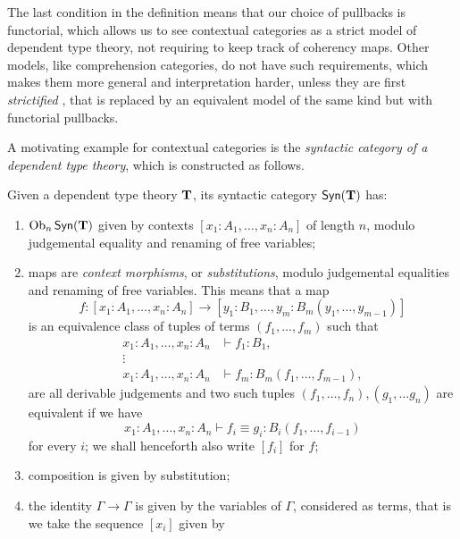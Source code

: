 \begin{rmk}
  The last condition in the definition means that our choice of pullbacks is
  functorial, which allows us to see contextual categories as a strict model of
  dependent type theory, not requiring to keep track of coherency maps.
  Other models, like comprehension categories, do not
  have such requirements, which makes them more general and
  interpretation harder, unless they are first \emph{strictified} \cite{Lum15},
  that is replaced by an equivalent model of the same kind but with functorial
  pullbacks.
\end{rmk}

\noindent
A motivating example for contextual categories is the \emph{syntactic category
of a dependent type theory}, which is constructed as follows.

\begin{construction}\cite[2.6]{Car78}
  Given a dependent type theory $\operatorname{\mathbf{T}}$, its syntactic category $\mathsf{Syn}(\mathbf{\operatorname{\mathbf{T}}})$ has:
  \begin{enumerate}
    \item $\operatorname{Ob}_n\mathsf{Syn}(\mathbf{\operatorname{\mathbf{T}}})$ given by contexts $[x_1:A_1,\ldots,x_n:A_n]$ of length
      $n$, modulo judgemental equality and renaming of free variables;
    \item maps are \emph{context morphisms}, or \emph{substitutions}, modulo
      judgemental equalities and renaming of free variables. This means that a
      map
      \[f\colon[x_1:A_1,\ldots,x_n:A_n]\rightarrow[y_1:B_1,\ldots,y_m:B_m(y_1,\ldots,y_{m-1})]\]
      is an equivalence class of tuples of terms $(f_1,\ldots,f_m)$ such that
      \begin{align*}
        x_1:A_1,\ldots,x_n:A_n &\vdash f_1:B_1, \\
        \vdots & \\
        x_1:A_1,\ldots,x_n:A_n &\vdash f_m:B_m(f_1,\ldots,f_{m-1}),
      \end{align*}
      are all derivable judgements and two such tuples
      $(f_1,\ldots,f_n),(g_1,\ldots g_n)$ are equivalent if we have
      \[x_1:A_1,\ldots,x_n:A_n\vdash f_i\equiv g_i:B_i(f_1,\ldots,f_{i-1})\]
      for every $i$; we shall henceforth also write $[f_i]$ for $f$;
    \item composition is given by substitution;
    \item the identity $\Gamma\rightarrow\Gamma$ is given by the variables of
      $\Gamma$, considered as
      terms, that is we take the sequence $[x_i]$ given by
      \begin{align*}

\end{align*}
\end{enumerate}
\end{construction}

